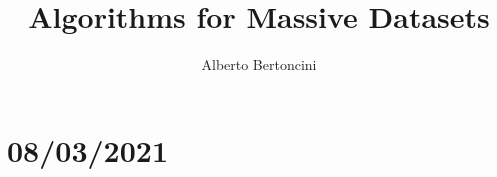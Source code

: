 \documentclass[14pt]{extarticle}
\title{{\Huge Algorithms for Massive Datasets}}
\author{{\huge Alberto Bertoncini}}
\begin{document}
\maketitle
\newpage
\tableofcontents
\newpage

\section{08/03/2021}
\end{document}
